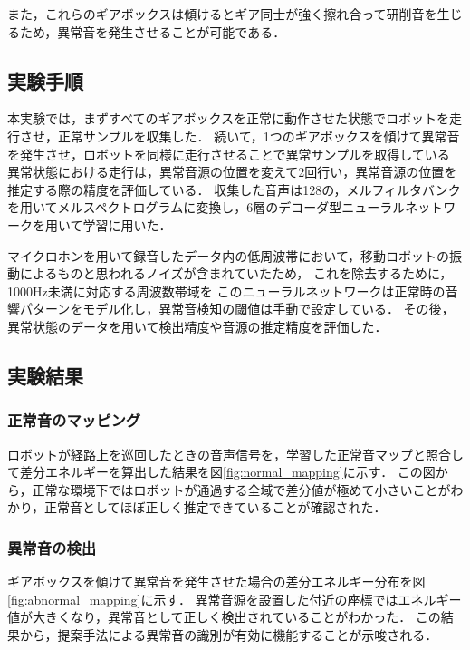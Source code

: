 \documentclass[../main]{subfiles}
\begin{document}
また，これらのギアボックスは傾けるとギア同士が強く擦れ合って研削音を生じるため，異常音を発生させることが可能である．
\subsection{実験手順} \label{subsec:experiment_procedure}

本実験では，まずすべてのギアボックスを正常に動作させた状態でロボットを走行させ，正常サンプルを収集した．
続いて，1つのギアボックスを傾けて異常音を発生させ，ロボットを同様に走行させることで異常サンプルを取得している
異常状態における走行は，異常音源の位置を変えて2回行い，異常音源の位置を推定する際の精度を評価している．
収集した音声は128の，メルフィルタバンクを用いてメルスペクトログラムに変換し，6層のデコーダ型ニューラルネットワークを用いて学習に用いた．

マイクロホンを用いて録音したデータ内の低周波帯において，移動ロボットの振動によるものと思われるノイズが含まれていたため，
これを除去するために，1000Hz未満に対応する周波数帯域を
このニューラルネットワークは正常時の音響パターンをモデル化し，異常音検知の閾値は手動で設定している．
その後，異常状態のデータを用いて検出精度や音源の推定精度を評価した．

\subsection{実験結果} \label{subsec:vexp_ref_result}

\subsubsection{正常音のマッピング} \label{subsubsec:normal_mapping}

ロボットが経路上を巡回したときの音声信号を，学習した正常音マップと照合して差分エネルギーを算出した結果を図\ref{fig:normal_mapping}に示す．
この図から，正常な環境下ではロボットが通過する全域で差分値が極めて小さいことがわかり，正常音としてほぼ正しく推定できていることが確認された．

\subsubsection{異常音の検出} \label{subsubsec:anomaly_detection}

ギアボックスを傾けて異常音を発生させた場合の差分エネルギー分布を図\ref{fig:abnormal_mapping}に示す．
異常音源を設置した付近の座標ではエネルギー値が大きくなり，異常音として正しく検出されていることがわかった．
この結果から，提案手法による異常音の識別が有効に機能することが示唆される．
\end{document}
